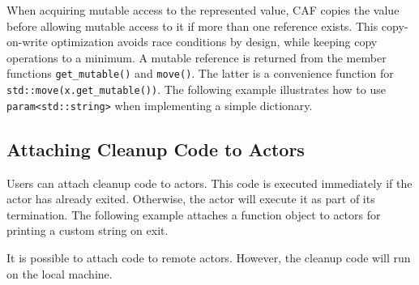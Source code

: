When acquiring mutable access to the represented value, CAF copies the value before allowing mutable access to it if more than one reference exists. This copy-on-write optimization avoids race conditions by design, while keeping copy operations to a minimum. A mutable reference is returned from the member functions \lstinline^get_mutable()^ and \lstinline^move()^. The latter is a convenience function for \lstinline^std::move(x.get_mutable())^. The following example illustrates how to use \lstinline^param<std::string>^ when implementing a simple dictionary.



\subsection{Attaching Cleanup Code to Actors}
\label{attach}

Users can attach cleanup code to actors. This code is executed immediately if the actor has already exited. Otherwise, the actor will execute it as part of its termination. The following example attaches a function object to actors for printing a custom string on exit.



It is possible to attach code to remote actors. However, the cleanup code will run on the local machine.
